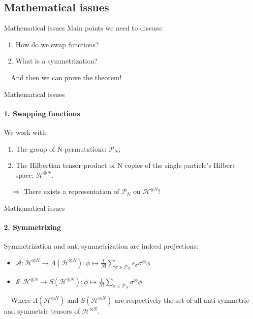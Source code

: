 \documentclass[xcolor=x11names, compress]{beamer}
\renewcommand{\(}{\begin{columns}}
\renewcommand{\)}{\end{columns}}
\newcommand{\<}[1]{\begin{column}{#1}}
\renewcommand{\>}{\end{column}}
\theoremstyle{definition}
\theoremstyle{plain}
\begin{document}
\subsection{Mathematical issues}
\begin{frame}{Mathematical issues}
\large{Main points we need to discuss:}
\begin{enumerate}
\item How do we swap functions?
\item What is a symmetrization?
\end{enumerate}
$\quad$\newline And then we can prove the theorem!
\end{frame}

\begin{frame}{Mathematical issues}
\framesubtitle{1. Swapping functions}
We work with:
\begin{enumerate}
\item The group of N-permutations: $\mathcal P_N$;
\item The Hilbertian tensor product of N copies of the single particle's Hilbert space: $\mathcal H^{\otimes N}$.
\end{enumerate}
{$\quad$\newline $\Rightarrow$ There exists a representation of $\mathcal P_N$ on $\mathcal H^{\otimes N}!$
}
\end{frame}

\begin{frame}{Mathematical issues}
\framesubtitle{2. Symmetrizing}
Symmetrization and anti-symmetrization are indeed projections:
\begin{itemize}
\item $\mathcal A: \mathcal H^{\otimes N}\to\Lambda(\mathcal H^{\otimes N}) : \phi\mapsto\frac{1}{N!}\sum_{\sigma\in\mathscr P_N}\epsilon_\sigma\sigma^\otimes\phi$
\item $\mathcal S: \mathcal H^{\otimes N}\to S(\mathcal H^{\otimes N}) : \phi\mapsto\frac{1}{N!}\sum_{\sigma\in\mathscr P_N}\sigma^\otimes\phi$
\end{itemize}
$\quad$\newline Where $\Lambda(\mathcal H^{\otimes N})$ and $S(\mathcal H^{\otimes N})$ are respectively the set of all anti-symmetric and symmetric tensors of $\mathcal H^{\otimes N}$.
\end{frame}
\end{document}
